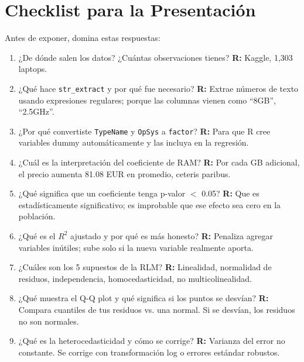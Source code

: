 \documentclass[12pt,a4paper]{article}
\begin{document}
\section{Checklist para la Presentación}

Antes de exponer, domina estas respuestas:

\begin{enumerate}
    \item ¿De dónde salen los datos? ¿Cuántas observaciones tienes? \textbf{R:} Kaggle, 1,303 laptops.
    
    \item ¿Qué hace \texttt{str\_extract} y por qué fue necesario? \textbf{R:} Extrae números de texto usando expresiones regulares; porque las columnas vienen como ``8GB'', ``2.5GHz''.
    
    \item ¿Por qué convertiste \texttt{TypeName} y \texttt{OpSys} a \texttt{factor}? \textbf{R:} Para que R cree variables dummy automáticamente y las incluya en la regresión.
    
    \item ¿Cuál es la interpretación del coeficiente de RAM? \textbf{R:} Por cada GB adicional, el precio aumenta 81.08 EUR en promedio, ceteris paribus.
    
    \item ¿Qué significa que un coeficiente tenga p-valor $<$ 0.05? \textbf{R:} Que es estadísticamente significativo; es improbable que ese efecto sea cero en la población.
    
    \item ¿Qué es el $R^2$ ajustado y por qué es más honesto? \textbf{R:} Penaliza agregar variables inútiles; sube solo si la nueva variable realmente aporta.
    
    \item ¿Cuáles son los 5 supuestos de la RLM? \textbf{R:} Linealidad, normalidad de residuos, independencia, homocedasticidad, no multicolinealidad.
    
    \item ¿Qué muestra el Q-Q plot y qué significa si los puntos se desvían? \textbf{R:} Compara cuantiles de tus residuos vs. una normal. Si se desvían, los residuos no son normales.
    
    \item ¿Qué es la heterocedasticidad y cómo se corrige? \textbf{R:} Varianza del error no constante. Se corrige con transformación log o errores estándar robustos.
    

\end{enumerate}
\end{document}
